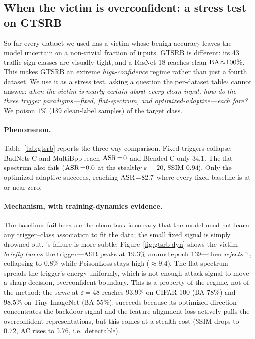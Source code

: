 \subsection{When the victim is overconfident: a stress test on GTSRB}
\label{sec:gtsrb}

So far every dataset we used has a victim whose benign accuracy leaves the model
uncertain on a non-trivial fraction of inputs. GTSRB is different: its 43
traffic-sign classes are visually tight, and a ResNet-18 reaches clean
$\mathrm{BA}\!\approx\!100\%$. This makes GTSRB an extreme \emph{high-confidence}
regime rather than just a fourth dataset. We use it as a stress test, asking a
question the per-dataset tables cannot answer: \emph{when the victim is nearly
certain about every clean input, how do the three trigger paradigms---fixed,
flat-spectrum, and optimized-adaptive---each fare?} We poison $1\%$ (189
clean-label samples) of the target class.



\paragraph{Phenomenon.} Table~\ref{tab:gtsrb} reports the three-way comparison.
Fixed triggers collapse: BadNets-C and MultiBpp reach $\mathrm{ASR}\!=\!0$ and Blended-C
only $34.1$. The flat-spectrum \kst{} also fails ($\mathrm{ASR}\!=\!0.0$ at the stealthy
$\varepsilon\!=\!20$, SSIM $0.94$). Only the optimized-adaptive \faat{}
succeeds, reaching $\mathrm{ASR}\!=\!82.7$ where every fixed baseline is at or near zero.



\paragraph{Mechanism, with training-dynamics evidence.}
The baselines fail because the clean task is so easy that the model need not
learn any trigger--class association to fit the data; the small fixed signal is
simply drowned out. \kst's failure is more subtle: Figure~\ref{fig:gtsrb-dyn}
shows the victim \emph{briefly learns} the trigger---ASR peaks at $19.3\%$
around epoch 139---then \emph{rejects} it, collapsing to $0.8\%$ while
PoisonLoss stays high ($\approx\!9.4$). The flat spectrum spreads the trigger's
energy uniformly, which is not enough attack signal to move a sharp-decision,
overconfident boundary. This is a property of the regime, not of the method:
the \emph{same} \kst{} at $\varepsilon\!=\!48$ reaches $93.9\%$ on CIFAR-100
(BA $78\%$) and $98.5\%$ on Tiny-ImageNet (BA $55\%$). \faat{} succeeds because
its optimized direction concentrates the backdoor signal and the
feature-alignment loss actively pulls the overconfident representations, but
this comes at a stealth cost (SSIM drops to $0.72$, AC rises to $0.76$, i.e.\
detectable).

